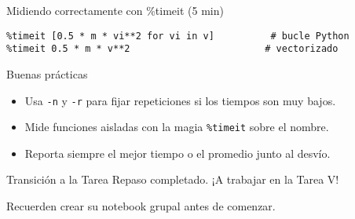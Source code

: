 \documentclass[10pt]{beamer}
\begin{document}
\begin{frame}[fragile]{Midiendo correctamente con \%timeit (5 min)}
\begin{verbatim}
%timeit [0.5 * m * vi**2 for vi in v]          # bucle Python
%timeit 0.5 * m * v**2                        # vectorizado
\end{verbatim}
\begin{block}{Buenas prácticas}
\begin{itemize}
  \item Usa \texttt{-n} y \texttt{-r} para fijar repeticiones si los tiempos son muy bajos.
  \item Mide funciones aisladas con la magia \texttt{\%timeit} sobre el nombre.
  \item Reporta siempre el mejor tiempo o el promedio junto al desvío.
\end{itemize}
\end{block}
\end{frame}

%
%
%

\begin{frame}{Transición a la Tarea}
\Large
Repaso completado. ¡A trabajar en la Tarea V!

\vspace{0.4cm}
\small
Recuerden crear su notebook grupal antes de comenzar.
\end{frame}
\end{document}
